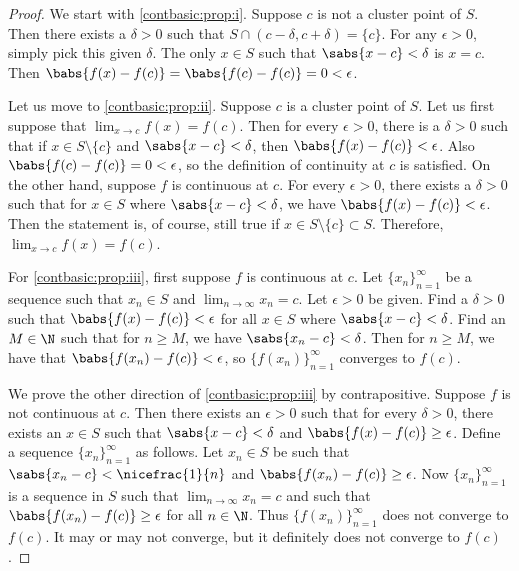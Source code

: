 \begin{proof}
\pagebreak[2]
We start with \ref{contbasic:prop:i}.  Suppose $c$ is not a cluster point of
$S$.  Then there exists a $\delta > 0$
such that $S \cap (c-\delta,c+\delta) = \{ c \}$.
For any $\epsilon > 0$, simply pick this given $\delta$.
The only $x \in S$ such that $\sabs{x-c} < \delta$ is $x=c$.  Then
$\babs{f(x)-f(c)} = \babs{f(c)-f(c)} = 0 < \epsilon$.

Let us move to \ref{contbasic:prop:ii}.
Suppose $c$ is a cluster point of $S$.  Let us first suppose
that $\lim_{x\to c} f(x) = f(c)$.  Then for every $\epsilon > 0$,
there is a $\delta > 0$ such that if $x \in S \setminus \{ c \}$
and $\sabs{x-c} < \delta$, then $\babs{f(x)-f(c)} < \epsilon$.
Also $\babs{f(c)-f(c)} = 0 < \epsilon$, so the definition of continuity at
$c$ is satisfied.  On the other hand, suppose $f$ is continuous
at $c$.  For every $\epsilon > 0$, there exists a $\delta > 0$
such that for $x \in S$ where $\sabs{x-c} < \delta$, we have
$\babs{f(x)-f(c)} < \epsilon$.  Then the statement is, of course, still true if
$x \in S \setminus \{ c \} \subset S$.  Therefore, $\lim_{x\to c} f(x) =
f(c)$.

For \ref{contbasic:prop:iii}, first suppose $f$ is continuous at $c$.
Let $\{ x_n \}_{n=1}^\infty$
be a sequence such that $x_n \in S$ and $\lim_{n\to\infty} x_n = c$.  Let $\epsilon > 0$
be given.  Find a $\delta > 0$ such that $\babs{f(x)-f(c)} < \epsilon$
for all $x \in S$ where $\sabs{x-c} < \delta$.  Find an $M \in \N$
such that for $n \geq M$, we have $\sabs{x_n-c} < \delta$.  Then for
$n \geq M$, we have that $\babs{f(x_n)-f(c)} < \epsilon$,
so $\bigl\{ f(x_n) \bigr\}_{n=1}^\infty$
converges to $f(c)$.

We prove the other direction of \ref{contbasic:prop:iii} by contrapositive.
Suppose $f$ is not
continuous at $c$.  Then there exists an $\epsilon > 0$
such that for every $\delta > 0$, there exists an $x \in S$
such that $\sabs{x-c} < \delta$ and $\babs{f(x)-f(c)} \geq \epsilon$.
Define a sequence $\{ x_n \}_{n=1}^\infty$ as follows.
Let $x_n \in S$ be such that $\sabs{x_n-c} < \nicefrac{1}{n}$
and $\babs{f(x_n)-f(c)} \geq \epsilon$.
Now $\{ x_n \}_{n=1}^\infty$ is
a sequence in $S$ such that
$\lim_{n\to\infty} x_n = c$ and such that
$\babs{f(x_n)-f(c)} \geq \epsilon$ for all $n \in \N$.
Thus $\bigl\{ f(x_n) \bigr\}_{n=1}^\infty$
does not converge to $f(c)$.  It may or may not converge, but it definitely
does not converge to $f(c)$.  
\end{proof}

